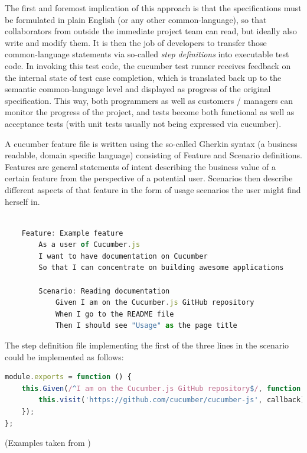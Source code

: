 	The first and foremost implication of this approach is that the specifications must be formulated in plain English (or any other common-language), so that collaborators from outside the immediate project team can read, but ideally also write and modify them. It is then the job of developers to transfer those common-language statements via so-called \textit{step definitions} into executable test code. In invoking this test code, the cucumber test runner receives feedback on the internal state of test case completion, which is translated back up to the semantic common-language level and displayed as progress of the original specification. This way, both programmers as well as customers / managers can monitor the progress of the project, and tests become both functional as well as acceptance tests (with unit tests usually not being expressed via cucumber).
	
	A cucumber feature file is written using the so-called Gherkin syntax (a business readable, domain specific language) consisting of Feature and Scenario definitions. Features are general statements of intent describing the business value of a certain feature from the perspective of a potential user. Scenarios then describe different aspects of that feature in the form of usage scenarios the user might find herself in.
	
	\begin{lstlisting}[caption={Cucumber example describing a Feature containing a simple Scenario}, label={fig:cucumber}, language=JavaScript]
	
	Feature: Example feature
		As a user of Cucumber.js
		I want to have documentation on Cucumber
		So that I can concentrate on building awesome applications
		
		Scenario: Reading documentation
			Given I am on the Cucumber.js GitHub repository
			When I go to the README file
			Then I should see "Usage" as the page title	
	\end{lstlisting}
	
	The step definition file implementing the first of the three lines in the scenario could be implemented as follows:
	
	\begin{lstlisting}[caption={Cucumber example describing a Feature containing a simple Scenario}, label={fig:cucumber}, language=JavaScript]	
module.exports = function () {
	this.Given(/^I am on the Cucumber.js GitHub repository$/, function (callback) {
		this.visit('https://github.com/cucumber/cucumber-js', callback);
	});
};
	\end{lstlisting}
	\small
	(Examples taken from \citep{CucumberJS})
	
